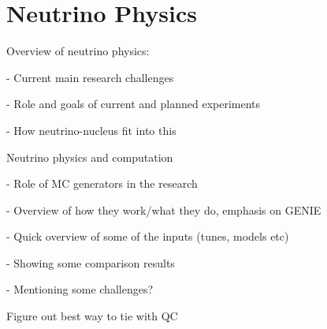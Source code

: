
\chapter{Neutrino Physics}

Overview of neutrino physics:

- Current main research challenges

- Role and goals of current and planned experiments

- How neutrino-nucleus fit into this

Neutrino physics and computation

- Role of MC generators in the research

- Overview of how they work/what they do, emphasis on GENIE

- Quick overview of some of the inputs (tunes, models etc)

- Showing some comparison results

- Mentioning some challenges?

Figure out best way to tie with QC